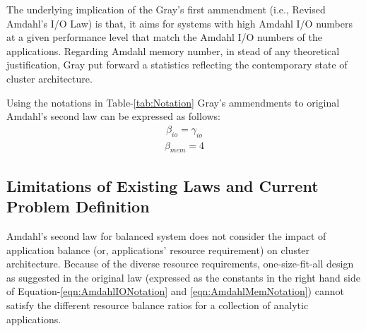\documentclass[journal]{IEEEtran}
\begin{document}
The underlying implication of the Gray's first ammendment (i.e., Revised Amdahl's I/O Law) is that, it aims for systems with high Amdahl I/O numbers at a given performance level that match the Amdahl I/O  numbers of the applications. Regarding Amdahl memory number, in stead of any theoretical justification, Gray put forward a statistics reflecting the contemporary state of cluster architecture. 

Using the notations in Table-\ref{tab:Notation} Gray's ammendments to original Amdahl's second law can be expressed as follows:
\begin{equation} \label{eqn:GrayIONotation}
\begin{split}
\beta_{io} = \gamma_{io}
\end{split}
\end{equation}
\begin{equation} \label{eqn:GrayMemNotation}
\begin{split}
\beta_{mem} = 4
\end{split}
\end{equation}

\subsection{Limitations of Existing Laws and Current Problem Definition}
Amdahl's second law for balanced system does not consider the impact of application balance (or, applications' resource requirement) on cluster architecture. Because of the diverse resource requirements, one-size-fit-all design as suggested in the original law (expressed as the constants in the right hand side of Equation-\ref{eqn:AmdahlIONotation} and \ref{eqn:AmdahlMemNotation}) cannot satisfy the different resource balance ratios for a collection of analytic applications. 
\end{document}
